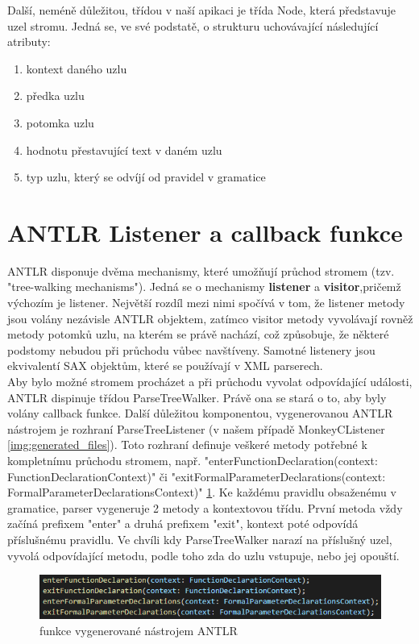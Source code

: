 

Další, neméně důležitou, třídou v naší apikaci je třída Node, která představuje uzel stromu. Jedná se, ve své podstatě, o strukturu uchovávající následující atributy:\\
\begin{enumerate}
	\item kontext daného uzlu
	\item předka uzlu
	\item potomka uzlu
	\item hodnotu přestavující text v daném uzlu
	\item typ uzlu, který se odvíjí od pravidel v gramatice
\end{enumerate}




\section{ANTLR Listener a callback funkce}
ANTLR disponuje dvěma mechanismy, které umožňují průchod stromem (tzv. "tree-walking mechanisms"). Jedná se o mechanismy \textbf{listener} a \textbf{visitor},pričemž výchozím je listener. Největší rozdíl mezi nimi spočívá v tom, že listener metody jsou volány nezávisle ANTLR objektem, zatímco visitor metody vyvolávají rovněž metody potomků uzlu, na kterém se právě nachází, což způsobuje, že některé podstomy nebudou při průchodu vůbec navštíveny. Samotné listenery jsou ekvivalentí SAX objektům, které se používají v XML parserech.\\
Aby bylo možné stromem procházet a při průchodu vyvolat odpovídající události, ANTLR dispinuje třídou ParseTreeWalker. Právě ona se stará o to, aby byly volány callback funkce. Další důležitou komponentou, vygenerovanou ANTLR nástrojem je rozhraní ParseTreeListener (v našem případě MonkeyCListener \ref{img:generated_files}). Toto rozhraní definuje veškeré metody potřebné k kompletnímu průchodu stromem, např. "enterFunctionDeclaration(context: FunctionDeclarationContext)" či "exitFormalParameterDeclarations(context: FormalParameterDeclarationsContext)" \ref{img:listener_functions}. Ke každému pravidlu obsaženému v gramatice, parser vygeneruje 2 metody a kontextovou třídu. První metoda vždy začíná prefixem "enter" a druhá prefixem "exit", kontext poté odpovídá příslušnému pravidlu. Ve chvíli kdy ParseTreeWalker narazí na příslušný uzel, vyvolá odpovídající metodu, podle toho zda do uzlu vstupuje, nebo jej opouští.

\begin{figure}[t]
	\centering
	\includegraphics[scale=1]{images/listener_functions}
	\caption{funkce vygenerované nástrojem ANTLR} 			    
	\label{img:listener_functions}
\end{figure}

\endinput
